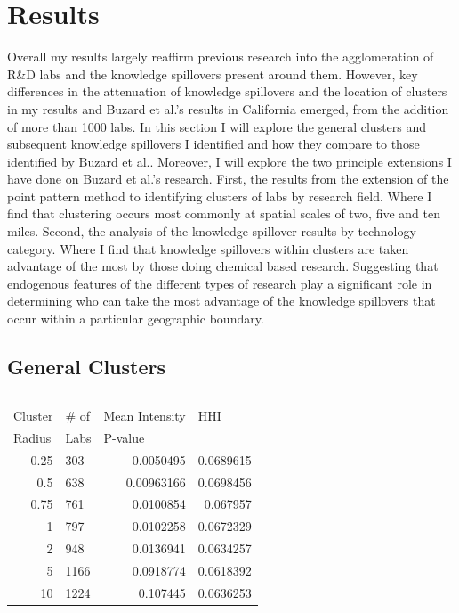 \documentclass[12pt,letterpaper]{article}
\begin{document}
\section{Results}
Overall my results largely reaffirm previous research into the agglomeration of R\&D labs and the knowledge spillovers present around them. However, key differences in the attenuation of knowledge spillovers and the location of clusters in my results and Buzard et al.'s results in California emerged, from the addition of more than 1000 labs. 
In this section I will explore the general clusters and subsequent knowledge spillovers I identified and how they compare to those identified by Buzard et al.. Moreover, I will explore the two principle extensions I have done on Buzard et al.'s research. First, the results from the extension of the point pattern method to identifying clusters of labs by research field. Where I find that clustering occurs most commonly at spatial scales of two, five and ten miles. Second, the analysis of the knowledge spillover results by technology category. Where I find that knowledge spillovers within clusters are taken advantage of the most by those doing chemical based research. Suggesting that endogenous features of the different types of research play a significant role in determining who can take the most advantage of the knowledge spillovers that occur within a particular geographic boundary.  
\subsection{General Clusters}
\begin{table}[H]
\centering
\begin{tabular}{rlrr}
\hline
\multicolumn{1}{l}{Cluster} & \# of & \multicolumn{1}{l}{Mean Intensity} & \multicolumn{1}{l}{HHI} \\
\multicolumn{1}{l}{Radius}  & Labs  & \multicolumn{1}{l}{P-value}        & \multicolumn{1}{l}{}    \\ \hline
0.25 & 303  & 0.0050495  & 0.0689615 \\
0.5  & 638  & 0.00963166 & 0.0698456 \\
0.75 & 761  & 0.0100854  & 0.067957  \\
1    & 797  & 0.0102258  & 0.0672329 \\
2    & 948  & 0.0136941  & 0.0634257 \\
5    & 1166 & 0.0918774  & 0.0618392 \\
10   & 1224 & 0.107445   & 0.0636253 \\ \hline
\end{tabular}
\caption{}
\label{tab:my-table}
\end{table}
\end{document}
